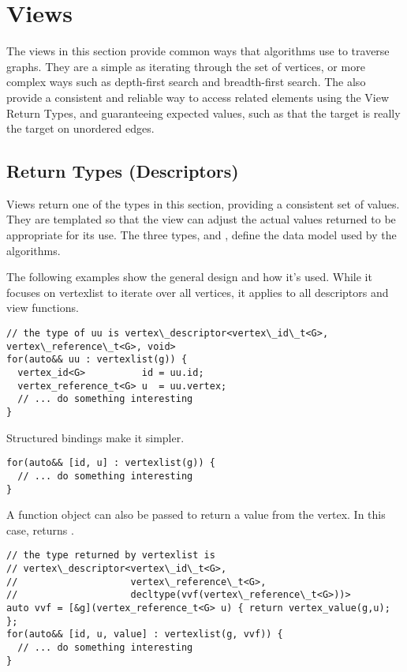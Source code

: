 \chapter{Views}

The views in this section provide common ways that algorithms use to traverse graphs. They are a simple as iterating through the set of vertices, or more complex ways such as depth-first search and breadth-first search. The also provide a consistent and reliable way to access related elements using the View Return Types, and guaranteeing expected values, such as that the target is really the target on unordered edges.

\section{Return Types (Descriptors)}
Views return one of the types in this section, providing a consistent set of values. They are templated so that the view can adjust the 
actual values returned to be appropriate for its use. The three types,  and 
, define the data model used by the algorithms.

The following examples show the general design and how it's used. While it focuses 
on vertexlist to iterate over all vertices, it applies to all descriptors and view functions.

\begin{lstlisting}
// the type of uu is vertex\_descriptor<vertex\_id\_t<G>, vertex\_reference\_t<G>, void>
for(auto&& uu : vertexlist(g)) {
  vertex_id<G>          id = uu.id;
  vertex_reference_t<G> u  = uu.vertex;
  // ... do something interesting
}
\end{lstlisting}

Structured bindings make it simpler.
\begin{lstlisting}
for(auto&& [id, u] : vertexlist(g)) {
  // ... do something interesting
}
\end{lstlisting}

A function object can also be passed to return a value from the vertex. In this case,  returns .
\begin{lstlisting}
// the type returned by vertexlist is 
// vertex\_descriptor<vertex\_id\_t<G>, 
//                    vertex\_reference\_t<G>, 
//                    decltype(vvf(vertex\_reference\_t<G>))>
auto vvf = [&g](vertex_reference_t<G> u) { return vertex_value(g,u); };
for(auto&& [id, u, value] : vertexlist(g, vvf)) {
  // ... do something interesting
}
\end{lstlisting}

